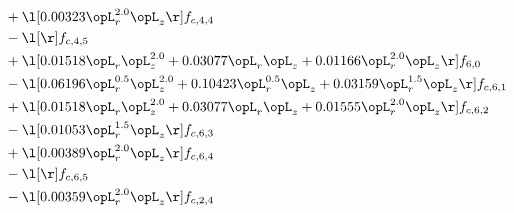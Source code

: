 \begin{alignat}{2}
& + \l[  0.00323 \opL_r^{2.0} \opL_z  \r] f_{c,4,4} \nonumber \\ 
& - \l[  \r] f_{c,4,5} \nonumber \\ 
& + \l[  0.01518 \opL_r \opL_z^{2.0} +  0.03077 \opL_r \opL_z +  0.01166 \opL_r^{2.0} \opL_z  \r] f_{6,0} \nonumber \\ 
& - \l[  0.06196 \opL_r^{0.5} \opL_z^{2.0} +  0.10423 \opL_r^{0.5} \opL_z +  0.03159 \opL_r^{1.5} \opL_z  \r] f_{c,6,1} \nonumber \\ 
& + \l[  0.01518 \opL_r \opL_z^{2.0} +  0.03077 \opL_r \opL_z +  0.01555 \opL_r^{2.0} \opL_z  \r] f_{c,6,2} \nonumber \\ 
& - \l[  0.01053 \opL_r^{1.5} \opL_z  \r] f_{c,6,3} \nonumber \\ 
& + \l[  0.00389 \opL_r^{2.0} \opL_z  \r] f_{c,6,4} \nonumber \\ 
& - \l[  \r] f_{c,6,5} \nonumber \\ 
& - \l[  0.00359 \opL_r^{2.0} \opL_z  \r] f_{c,2,4} \nonumber \\ 
\end{alignat} 


